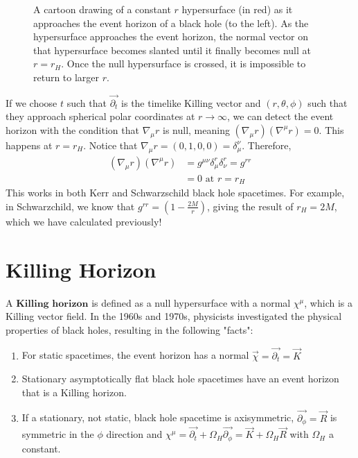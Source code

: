 \documentclass[11pt,table]{article}
\begin{document}
\begin{figure}[h]
\begin{tikzpicture}[x=0.75pt,y=0.75pt,yscale=-1,xscale=1]
\end{tikzpicture}
\caption{A cartoon drawing of a constant $r$ hypersurface (in red) as it approaches the event horizon of a black hole (to the left). As the hypersurface approaches the event horizon, the normal vector on that hypersurface becomes slanted until it finally becomes null at $r = r_H$. Once the null hypersurface is crossed, it is impossible to return to larger $r$.}
\end{figure}
If we choose $t$ such that $\vec{\partial_{t}}$ is the timelike Killing vector and $(r,\theta,\phi)$ such that they approach spherical polar coordinates at $r \xrightarrow{} \infty$, we can detect the event horizon with the condition that $\nabla_{\mu}r$ is null, meaning $(\nabla_{\mu}r)(\nabla^{\mu}r)=0$. This happens at $r = r_{H}$.
Notice that $\nabla_\mu r = (0,1,0,0) = \delta_\mu^\nu$. Therefore,
\begin{align*}
(\nabla_{\mu}r)(\nabla^{\mu}r)&=
g^{\mu\nu}\delta_\mu^r\delta_\nu^r
=g^{rr} \\
 &=0 \text{ at } r = r_H 
\end{align*}
This works in both Kerr and Schwarzschild black hole spacetimes. For example, in Schwarzchild, we know that $g^{rr} = (1-\frac{2M}{r})$, giving the result of $r_H = 2M$, which we have calculated previously!

\section{Killing Horizon}

A $\textbf{Killing horizon}$ is defined as a null hypersurface with a normal $\chi^\mu$, which is a Killing vector field. In the 1960s and 1970s, physicists investigated the physical properties of black holes, resulting in the following "facts":

\begin{enumerate}
    \item For static spacetimes, the event horizon has a normal $\vec{\chi} = \vec{\partial_{t}} = \vec{K}$
    \item Stationary asymptotically flat black hole spacetimes have an event horizon that is a Killing horizon.
    \item If a stationary, not static, black hole spacetime is axisymmetric, $\vec{\partial_{\phi}} = \vec{R}$  is symmetric in the $\phi$  direction and $\chi^\mu = \vec{\partial_{t}} + \Omega_H\vec{\partial_{\phi}} = \vec{K} + \Omega_H\vec{R}$ with $\Omega_H$ a constant.
\end{enumerate}
\end{document}
